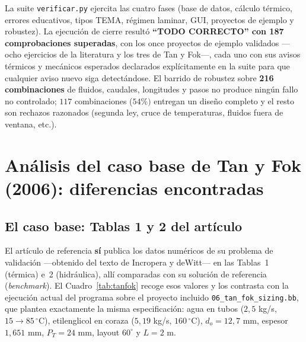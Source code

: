 \documentclass[11pt,a4paper]{article}
\begin{document}
La suite \texttt{verificar.py} ejercita las cuatro fases (base de datos,
c\'alculo t\'ermico, errores educativos, tipos TEMA, r\'egimen laminar,
GUI, proyectos de ejemplo y robustez). La ejecuci\'on de cierre result\'o
\textbf{``TODO CORRECTO'' con 187 comprobaciones superadas}, con los once
proyectos de ejemplo validados ---ocho ejercicios de la literatura y los tres
de Tan y Fok---, cada uno con sus avisos t\'ermicos y mec\'anicos
esperados declarados expl\'icitamente en la suite para que cualquier aviso
nuevo siga detect\'andose. El barrido de robustez sobre \textbf{216
combinaciones} de fluidos, caudales, longitudes y pasos no produce ning\'un
fallo no controlado; $117$ combinaciones ($54\%)$ entregan un dise\~no
completo y el resto son rechazos razonados (segunda ley, cruce de
temperaturas, fluidos fuera de ventana, etc.).

\section{An\'alisis del caso base de Tan y Fok (2006): diferencias
encontradas}
\label{sec:tanfok-analisis}

\subsection{El caso base: Tablas 1 y 2 del art\'iculo}

El art\'iculo de referencia \cite{tanfok} \textbf{s\'i} publica los datos
num\'ericos de su problema de validaci\'on ---obtenido del texto de
Incropera y deWitt--- en las Tablas~1 (t\'ermica) e~2 (hidr\'aulica), all\'i
comparadas con su soluci\'on de referencia (\emph{benchmark}). El
Cuadro~\ref{tab:tanfok} recoge esos valores y los contrasta con la
ejecuci\'on actual del programa sobre el proyecto incluido
\texttt{06\_tan\_fok\_sizing.bb}, que plantea exactamente la misma
especificaci\'on: agua en tubos ($2{,}5$ kg/s, $15 \rightarrow 85\,^\circ$C),
etilenglicol en coraza ($5{,}19$ kg/s, $160\,^\circ$C), $d_o = 12{,}7$ mm,
espesor $1{,}651$ mm, $P_T = 24$ mm, layout $60^\circ$ y $L = 2$ m.
\end{document}
